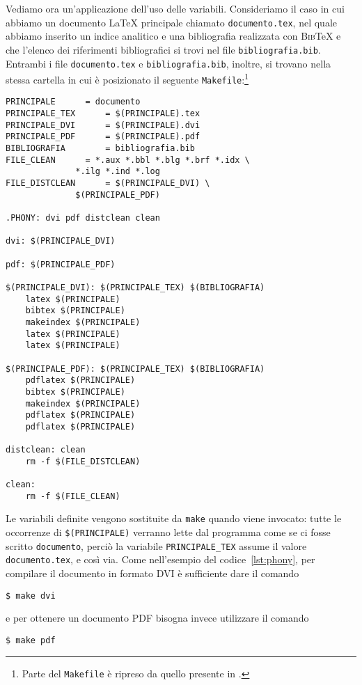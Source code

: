 Vediamo ora un'applicazione dell'uso delle variabili.  Consideriamo il caso in
cui abbiamo un documento \LaTeX{}
principale chiamato \texttt{documento.tex}, nel quale abbiamo inserito un indice
analitico e una bibliografia realizzata con \textsc{Bib}\TeX{}
e che l'elenco dei riferimenti bibliografici si trovi nel file
\texttt{bibliografia.bib}.  Entrambi i file \texttt{documento.tex} e
\texttt{bibliografia.bib}, inoltre, si trovano nella stessa cartella in cui è
posizionato il seguente
\texttt{Makefile}:\footnote{Parte del \texttt{Makefile} è ripreso da quello
  presente in \textcite[61]{caucci:tabelle}.}
\begin{lstlisting}[caption={Esempio di \texttt{Makefile} che utilizza le
variabili.},label=lst:variabili]
PRINCIPALE 		= documento
PRINCIPALE_TEX		= $(PRINCIPALE).tex
PRINCIPALE_DVI		= $(PRINCIPALE).dvi
PRINCIPALE_PDF		= $(PRINCIPALE).pdf
BIBLIOGRAFIA		= bibliografia.bib
FILE_CLEAN		= *.aux *.bbl *.blg *.brf *.idx \
			  *.ilg *.ind *.log
FILE_DISTCLEAN		= $(PRINCIPALE_DVI) \
			  $(PRINCIPALE_PDF)

.PHONY: dvi pdf distclean clean

dvi: $(PRINCIPALE_DVI)

pdf: $(PRINCIPALE_PDF)

$(PRINCIPALE_DVI): $(PRINCIPALE_TEX) $(BIBLIOGRAFIA)
	latex $(PRINCIPALE)
	bibtex $(PRINCIPALE)
	makeindex $(PRINCIPALE)
	latex $(PRINCIPALE)
	latex $(PRINCIPALE)

$(PRINCIPALE_PDF): $(PRINCIPALE_TEX) $(BIBLIOGRAFIA)
	pdflatex $(PRINCIPALE)
	bibtex $(PRINCIPALE)
	makeindex $(PRINCIPALE)
	pdflatex $(PRINCIPALE)
	pdflatex $(PRINCIPALE)

distclean: clean
	rm -f $(FILE_DISTCLEAN)

clean:
	rm -f $(FILE_CLEAN)
\end{lstlisting}
Le variabili definite vengono sostituite da \texttt{make} quando viene invocato:
tutte le occorrenze di \texttt{\$(PRINCIPALE)} verranno lette dal programma come
se ci fosse scritto \texttt{documento}, perciò la variabile
\texttt{PRINCIPALE\_TEX} assume il valore \texttt{documento.tex}, e così
via. Come nell'esempio del codice~\ref{lst:phony}, per compilare il documento in
formato \textsc{DVI} è sufficiente dare il comando
\begin{verbatim}
$ make dvi
\end{verbatim} %
e per ottenere un documento \textsc{PDF} bisogna invece utilizzare il comando
\begin{verbatim}
$ make pdf
\end{verbatim} %

